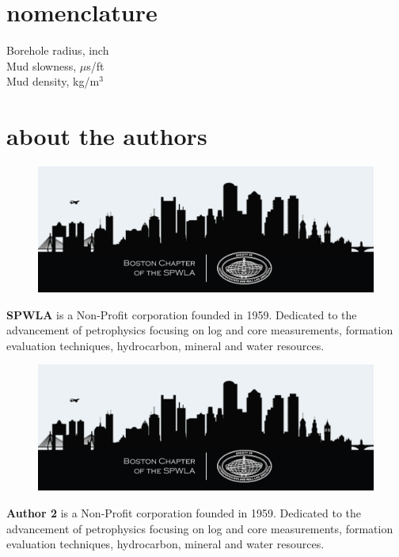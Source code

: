 \documentclass[10pt,twocolumn,twoside]{article}
\begin{document}
\section{nomenclature}
  Borehole radius, inch\\
  Mud slowness, $\mu$s/ft\\
  Mud density, kg/m$^3$



\section{about the authors}
\setlength\intextsep{0pt}
\begin{figure}
	\includegraphics[width=1.0\linewidth]{boston_chapter_logo.png}
	\vspace{0.03in}
\end{figure}
\textbf{SPWLA} is a Non-Profit corporation founded in 1959. Dedicated to the advancement of petrophysics focusing on log and core measurements, formation evaluation techniques, hydrocarbon, mineral and water resources.

\begin{figure}
	\includegraphics[width=1.0\linewidth]{boston_chapter_logo.png}
	\vspace{0.03in}
\end{figure}
\textbf{Author 2} is a Non-Profit corporation founded in 1959. Dedicated to the advancement of petrophysics focusing on log and core measurements, formation evaluation techniques, hydrocarbon, mineral and water resources.
\end{document}
